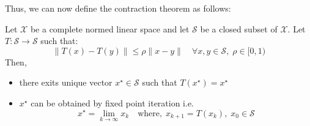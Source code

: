 Thus, we can now define the contraction theorem as follows:
\begin{theorem}
    Let \(\mathcal{X} \) be a complete normed linear space and let \(\mathcal{S} \) be a closed subset 
    of \(\mathcal{X} \). Let \(T : \mathcal{S} \to  \mathcal{S} \) such that:
    \[
        \lVert T(x) - T(y) \rVert \leq \rho  \lVert x - y \rVert \quad \forall x, y \in \mathcal{S}, \;
        \rho \in [0,1)
    \]
    Then,
    \begin{itemize}
        \item there exits  unique vector \(x^{\star} \in \mathcal{S}\) such that \(T(x^{\star}) = x^{\star}\)
        \item \(x^{\star} \) can be obtained by fixed point iteration i.e. 
        \[
            x^{\star}  = \lim\limits_{k \to \infty} x_k \quad \text{where}, \; x_{k+1} = T(x_k), \;
            x_0 \in \mathcal{S}
        \]
    \end{itemize}
\end{theorem}
